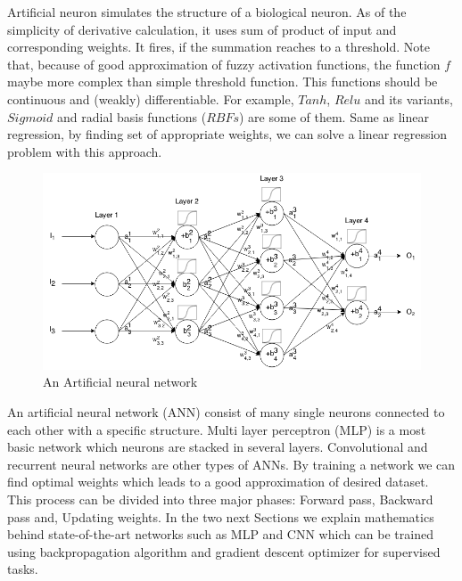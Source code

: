 \documentclass[10pt]{SelfArx} %
\begin{document}
%

Artificial neuron simulates the structure of a biological neuron. As of the simplicity of derivative calculation, it uses sum of product of input and corresponding weights. It fires, if the summation reaches to a threshold. Note that, because of good approximation of fuzzy activation functions, the function $f$ maybe more complex than simple threshold function. This functions should be continuous and (weakly) differentiable. For example, $Tanh$, $Relu$ and its variants, $Sigmoid$ and radial basis functions ($RBFs$) are some of them. Same as linear regression, by finding set of appropriate weights, we can solve a linear regression problem with this approach.

\begin{figure}\centering %
	\includegraphics[width=\linewidth]{img/ann}
	\caption{An Artificial neural network}	
\end{figure}

An artificial neural network (ANN) consist of many single neurons connected to each other with a specific structure. Multi layer perceptron (MLP) is a most basic network which neurons are stacked in several layers. Convolutional and recurrent neural networks are other types of ANNs. By training a network we can find optimal weights which leads to a good approximation of desired dataset. This process can be divided into three major phases:
Forward pass, Backward pass and, Updating weights. In the two next Sections we explain mathematics behind state-of-the-art networks such as MLP and CNN which can be trained using backpropagation algorithm and gradient descent optimizer for supervised tasks.
\end{document}
